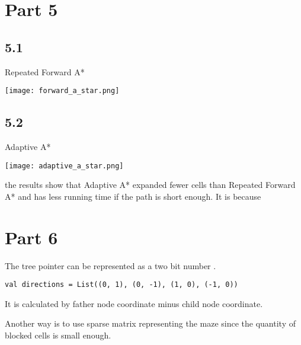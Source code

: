 \documentclass[12pt]{amsart}
\begin{document}
\section*{Part 5}
\subsection*{5.1}
Repeated Forward A*

\texttt{[image: forward\_a\_star.png]}

\subsection*{5.2}
Adaptive A*

\texttt{[image: adaptive\_a\_star.png]}

the results show that Adaptive A* expanded fewer cells than Repeated Forward A* and has less running time if the path is short enough. It is because
\newpage
\section*{Part 6}
The tree pointer can be represented as a two bit number .
\begin{lstlisting}
val directions = List((0, 1), (0, -1), (1, 0), (-1, 0))
\end{lstlisting}
It is calculated by father node coordinate minus child node coordinate.

Another way is to use sparse matrix representing the maze since the quantity of blocked cells is small enough.
\end{document}

